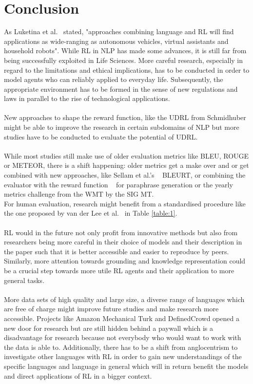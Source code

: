 \documentclass[11pt]{article}
\begin{document}
\section{Conclusion}\label{conclusion}
As Luketina et al.~ stated, "approaches combining language and RL will find applications as wide-ranging as autonomous vehicles, virtual assistants and household robots". While RL in NLP has made some advances, it is still far from being successfully exploited in Life Sciences. More careful research, especially in regard to the limitations and ethical implications, has to be conducted in order to model agents who can reliably applied to everyday life. Subsequently, the appropriate environment has to be formed in the sense of new regulations and laws in parallel to the rise of technological applications. \\\\
New approaches to shape the reward function, like the UDRL from Schmidhuber~ might be able to improve the research in certain subdomains of NLP but more studies have to be conducted to evaluate the potential of UDRL.\\\\
While most studies still make use of older evaluation metrics like BLEU, ROUGE or METEOR, there is a shift happening: older metrics get a make over and or get combined with new approaches, like Sellam et al.'s ~ BLEURT, or combining the evaluator with the reward function ~\cite{li-etal-2018-paraphrase} for paraphrase generation or the yearly metrics challenge from the WMT by the SIG MT. \\
For human evaluation, research might benefit from a standardised procedure like the one proposed by van der Lee et al.~ in Table \ref{table:1}.\\\\
RL would in the future not only profit from innovative methods but also from researchers being more careful in their choice of models and their description in the paper such that it is better accessible and easier to reproduce by peers. Similarly, more attention towards grounding and knowledge representation could be a crucial step towards more utile RL agents and their application to more general tasks.\\\\
More data sets of high quality and large size, a diverse range of languages which are free of charge might improve future studies and make research more accessible. Projects like Amazon Mechanical Turk and DefinedCrowd opened a new door for research but are still hidden behind a paywall which is a disadvantage for research because not everybody who would want to work with the data is able to. Additionally, there has to be a shift from anglocentrism to investigate other languages with RL in order to gain new understandings of the specific languages and language in general which will in return benefit the models and direct applications of RL in a bigger context.

\newpage


\end{document}
